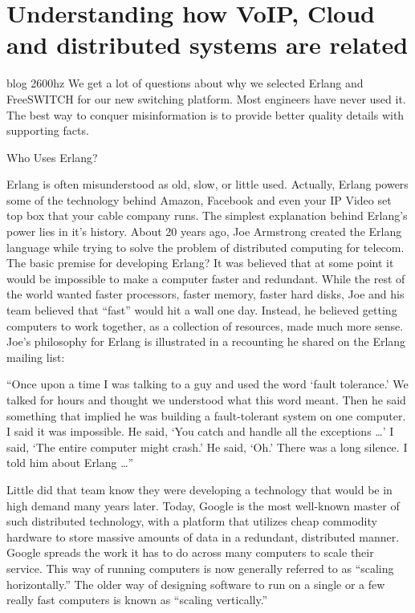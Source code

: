 \chapter{Understanding how VoIP, Cloud and distributed systems are related}
\label{ch:voipcloud}

blog 2600hz
We get a lot of questions about why we selected Erlang and FreeSWITCH for our new switching platform. Most engineers have never used it. The best way to conquer misinformation is to provide better quality details with supporting facts.

Who Uses Erlang?

Erlang is often misunderstood as old, slow, or little used. Actually, Erlang powers some of the technology behind Amazon, Facebook and even your IP Video set top box that your cable company runs. The simplest explanation behind Erlang’s power lies in it’s history. About 20 years ago, Joe Armstrong created the Erlang language while trying to solve the problem of distributed computing for telecom. The basic premise for developing Erlang? It was believed that at some point it would be impossible to make a computer faster and redundant. While the rest of the world wanted faster processors, faster memory, faster hard disks, Joe and his team believed that “fast” would hit a wall one day. Instead, he believed getting computers to work together, as a collection of resources, made much more sense. Joe’s philosophy for Erlang is illustrated in a recounting he shared on the Erlang mailing list: 

“Once upon a time I was talking to a guy and used the word ‘fault tolerance.’ We talked for hours and thought we understood what this word meant. Then he said something that implied he was building a fault-tolerant system on one computer. I said it was impossible. He said, ‘You catch and handle all the exceptions …’ I said, ‘The entire computer might crash.’ He said, ‘Oh.’ There was a long silence. I told him about Erlang …”

Little did that team know they were developing a technology that would be in high demand many years later. Today, Google is the most well-known master of such distributed technology, with a platform that utilizes cheap commodity hardware to store massive amounts of data in a redundant, distributed manner. Google spreads the work it has to do across many computers to scale their service. This way of running computers is now generally referred to as “scaling horizontally.” The older way of designing software to run on a single or a few really fast computers is known as “scaling vertically.” 

